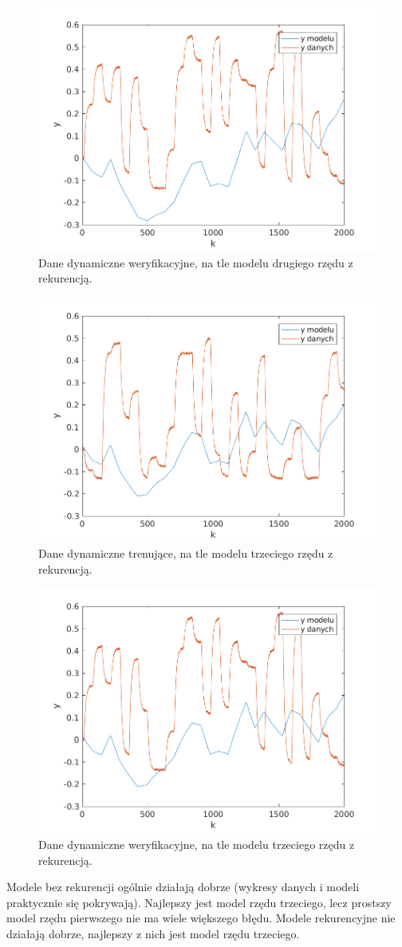\documentclass{article}
\begin{document}
\begin{figure}
	\centering
	\includegraphics[width=0.7\linewidth]{../dane_dynamiczne/model_rek_walid_2}
	\caption{Dane dynamiczne weryfikacyjne, na tle modelu drugiego rzędu z rekurencją.}
	\label{fig:model_rek_walid_2}
\end{figure}

\begin{figure}
	\centering
	\includegraphics[width=0.7\linewidth]{../dane_dynamiczne/model_rek_train_3}
	\caption{Dane dynamiczne trenujące, na tle modelu trzeciego rzędu z rekurencją.}
	\label{fig:model_rek_train_3}
\end{figure}

\begin{figure}
	\centering
	\includegraphics[width=0.7\linewidth]{../dane_dynamiczne/model_rek_walid_3}
	\caption{Dane dynamiczne weryfikacyjne, na tle modelu trzeciego rzędu z rekurencją.}
	\label{fig:model_rek_walid_3}
\end{figure}
Modele bez rekurencji ogólnie działają dobrze (wykresy danych i modeli praktycznie się pokrywają). Najlepszy jest model rzędu trzeciego, lecz prostszy model rzędu pierwszego nie ma wiele większego błędu. Modele rekurencyjne nie działają dobrze, najlepszy z nich jest model rzędu trzeciego.
\end{document}
